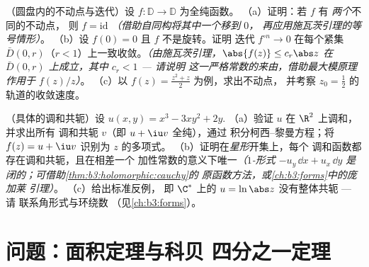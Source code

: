 \begin{exercise}[$\star\star$]\label{exo:b3:conformal:11}
（圆盘内的不动点与迭代）设 $f\colon\mathbb
D \to \mathbb D$ 为全纯函数。
（a）证明：若 $f$ 有 \emph{两个}不同的不动点，
则 $f = \mathrm{id}$ \emph{（借助自同构将其中一个移到 $0$，
再应用施瓦茨引理的等号情形）}。
（b）设 $f(0) = 0$ 且 $f$ 不是旋转。证明
迭代 $f^{\circ n} \to 0$ 在每个紧集
$\bar D(0, r)$（$r < 1$）上一致收敛。\emph{（由施瓦茨引理，$\abs{f(z)}
\leq c_r\abs z$ 在 $\bar D(0,r)$ 上成立，其中 $c_r < 1$ --- 请说明
这一严格常数的来由，借助最大模原理作用于
$f(z)/z$）}。
（c）以 $f(z) = \frac{z^2 + z}2$ 为例，求出不动点，
并考察 $z_0 =
\frac12$ 的轨道的收敛速度。
\end{exercise}

\begin{exercise}[$\star\star$]\label{exo:b3:conformal:12}
（具体的调和共轭）设 $u(x, y) = x^3 - 3xy^2
+ 2y$.
（a）验证 $u$ 在 $\R^2$ 上调和，并求出所有
调和共轭 $v$（即 $u + \iu v$ 全纯），通过
积分柯西–黎曼方程；将 $f(z) =
u + \iu v$ 识别为 $z$ 的多项式。
（b）证明在\emph{星形}开集上，每个
调和函数都存在调和共轭，且在相差一个
加性常数的意义下唯一\emph{（$1$-形式 $-u_y\,\dd x +
u_x\,\dd y$ 是闭的；可借助\cref{thm:b3:holomorphic:cauchy}的
原函数方法，或\cref{ch:b3:forms}中的庞加莱
引理）}。
（c）给出标准反例，
即 $\C^*$ 上的 $u = \ln\abs z$ 没有整体共轭 --- 请
联系角形式与环绕数
（见\cref{ch:b3:forms}）。
\end{exercise}

\section{问题：面积定理与科贝
四分之一定理}

